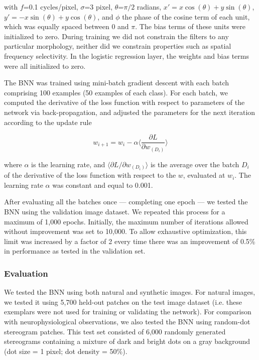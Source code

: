 with $f$=0.1 cycles/pixel, $\sigma$=3 pixel, $\theta$=$\pi/2$ radians, $x'=x \cos (\theta)+y \sin (\theta)$, $y'=-x \sin (\theta) + y \cos (\theta)$, and $\phi$  the phase of the cosine term of each unit, which was equally spaced between $0$ and $\pi$. The bias terms of these units were initialized to zero. During training we did not constrain the filters to any particular morphology, neither did we constrain properties such as spatial frequency selectivity. In the logistic regression layer, the weights and bias terms were all initialized to zero. 

The BNN was trained using mini-batch gradient descent with each batch comprising 100 examples (50 examples of each class). For each batch, we computed the derivative of the loss function with respect to parameters of the network via back-propagation, and adjusted the parameters for the next iteration according to the update rule

\begin{equation}
  w_{i+1}=w_i - \alpha \Bigg \langle \frac{\partial L}{\partial w_{(D_i)}} \Bigg \rangle
\end{equation}

where $\alpha$ is the learning rate, and $ \big \langle \partial L/ \partial w_{(D_i)}\big \rangle$ is the average over the batch $D_i$ of the derivative of the loss function with respect to the $w$, evaluated at $w_i$. The learning rate $\alpha$ was constant and equal to 0.001. 

After evaluating all the batches once --- completing one epoch --- we tested the BNN using the validation image dataset. We repeated this process for a maximum of 1,000 epochs. Initially, the maximum number of iterations allowed without improvement was set to 10,000. To allow exhaustive optimization, this limit was increased by a factor of 2 every time there was an improvement of 0.5\% in performance as tested in the validation set.

\subsubsection*{Evaluation}

We tested the BNN using both natural and synthetic images. For natural images, we tested it using 5,700 held-out patches on the test image dataset (i.e. these exemplars were not used for training or validating the network). For comparison with neurophysiological observations, we also tested the BNN using random-dot stereogram patches. This test set consisted of 6,000 randomly generated stereograms containing a mixture of dark and bright dots on a gray background (dot size = 1 pixel; dot density = 50\%). 

